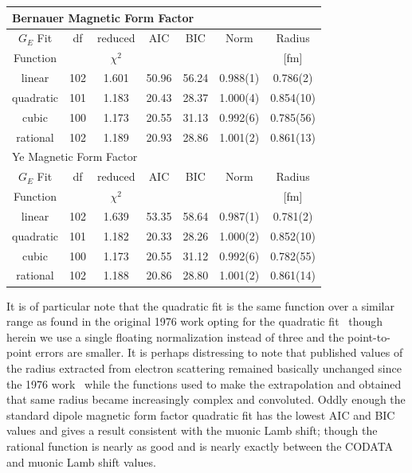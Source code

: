\documentclass[10pt,aps,prc,twocolumn]{revtex4-1}
\begin{document}
\begin{table}
\begin{tabular}{ccccccc}
\multicolumn{6}{l}{Bernauer Magnetic Form Factor}      \\  \hline
$G_E$ Fit & df  &reduced   & AIC    & BIC   & Norm & Radius    \\  
Function  &     &$\chi^2$  &        &       &               & [fm]      \\  \hline
linear    & 102 &1.601     & 50.96  & 56.24 & 0.988(1)  & 0.786(2)     \\
quadratic & 101 &1.183     & 20.43  & 28.37 & 1.000(4)  & 0.854(10)    \\ 
cubic     & 100 &1.173     & 20.55  & 31.13 & 0.992(6)  & 0.785(56)    \\ 
rational  & 102 &1.189     & 20.93  & 28.86 & 1.001(2)  & 0.861(13)    \\    \hline \hline
\multicolumn{6}{l}{Ye Magnetic Form Factor}                    \\ \hline
$G_E$ Fit & df  & reduced  & AIC    & BIC   & Norm     & Radius    \\  
Function  &     &$\chi^2$  &        &       &          & [fm]      \\  \hline
linear    & 102 &1.639 & 53.35  & 58.64 & 0.987(1) & 0.781(2)  \\
quadratic & 101 &1.182 & 20.33  & 28.26 & 1.000(2) & 0.852(10) \\
cubic     & 100 &1.173 & 20.55  & 31.12 & 0.992(6) & 0.782(55) \\ 
rational  & 102 &1.188 & 20.86  & 28.80 & 1.001(2) & 0.861(14) \\    \hline \hline
\end{tabular}
\label{datatable}
\end{table}


It is of particular note that the quadratic fit is the same function over a similar range as found in the original 1976 work opting for
the quadratic fit~\cite{Borkowski:1975} though herein we 
use a single floating normalization instead of three and the point-to-point errors are smaller.   
It is perhaps distressing to note that published values of the 
radius extracted from electron scattering remained basically unchanged since the 1976 work~\cite{Borkowski:1975} while the 
functions used to make the extrapolation and obtained that same radius became increasingly complex and convoluted.
Oddly enough the standard dipole magnetic form factor quadratic fit has the lowest AIC and BIC values and gives a result consistent
with the muonic Lamb shift; though the rational function is nearly as good and is nearly exactly between the CODATA
and muonic Lamb shift values.    
\end{document}
